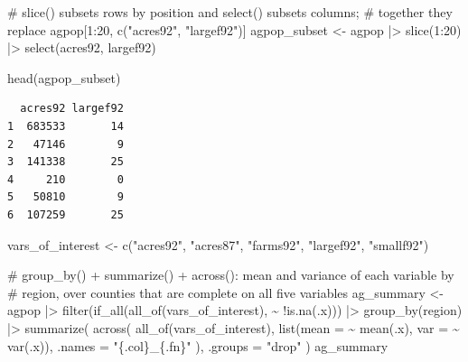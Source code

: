 \documentclass[
  letterpaper,
  DIV=11,
  numbers=noendperiod]{scrreprt}
\newenvironment{Shaded}{\begin{snugshade}}{\end{snugshade}}
\newcommand{\AttributeTok}[1]{\textcolor[rgb]{0.40,0.45,0.13}{#1}}
\newcommand{\CommentTok}[1]{\textcolor[rgb]{0.37,0.37,0.37}{#1}}
\newcommand{\DecValTok}[1]{\textcolor[rgb]{0.68,0.00,0.00}{#1}}
\newcommand{\FunctionTok}[1]{\textcolor[rgb]{0.28,0.35,0.67}{#1}}
\newcommand{\NormalTok}[1]{\textcolor[rgb]{0.00,0.23,0.31}{#1}}
\newcommand{\OtherTok}[1]{\textcolor[rgb]{0.00,0.23,0.31}{#1}}
\newcommand{\SpecialCharTok}[1]{\textcolor[rgb]{0.37,0.37,0.37}{#1}}
\newcommand{\StringTok}[1]{\textcolor[rgb]{0.13,0.47,0.30}{#1}}
\renewcommand{\[}{\begin{equation}}
\renewcommand{\]}{\end{equation}}
\begin{document}
\begin{Shaded}
\begin{Highlighting}[]
\CommentTok{\# slice() subsets rows by position and select() subsets columns;}
\CommentTok{\# together they replace agpop[1:20, c("acres92", "largef92")]}
\NormalTok{agpop\_subset }\OtherTok{\textless{}{-}}\NormalTok{ agpop }\SpecialCharTok{|\textgreater{}}
  \FunctionTok{slice}\NormalTok{(}\DecValTok{1}\SpecialCharTok{:}\DecValTok{20}\NormalTok{) }\SpecialCharTok{|\textgreater{}}
  \FunctionTok{select}\NormalTok{(acres92, largef92)}

\FunctionTok{head}\NormalTok{(agpop\_subset)}
\end{Highlighting}
\end{Shaded}

\begin{verbatim}
  acres92 largef92
1  683533       14
2   47146        9
3  141338       25
4     210        0
5   50810        9
6  107259       25
\end{verbatim}

\begin{Shaded}
\begin{Highlighting}[]
\NormalTok{vars\_of\_interest }\OtherTok{\textless{}{-}} \FunctionTok{c}\NormalTok{(}\StringTok{"acres92"}\NormalTok{, }\StringTok{"acres87"}\NormalTok{, }\StringTok{"farms92"}\NormalTok{, }\StringTok{"largef92"}\NormalTok{, }\StringTok{"smallf92"}\NormalTok{)}

\CommentTok{\# group\_by() + summarize() + across(): mean and variance of each variable by}
\CommentTok{\# region, over counties that are complete on all five variables}
\NormalTok{ag\_summary }\OtherTok{\textless{}{-}}\NormalTok{ agpop }\SpecialCharTok{|\textgreater{}}
  \FunctionTok{filter}\NormalTok{(}\FunctionTok{if\_all}\NormalTok{(}\FunctionTok{all\_of}\NormalTok{(vars\_of\_interest), }\SpecialCharTok{\textasciitilde{}} \SpecialCharTok{!}\FunctionTok{is.na}\NormalTok{(.x))) }\SpecialCharTok{|\textgreater{}}
  \FunctionTok{group\_by}\NormalTok{(region) }\SpecialCharTok{|\textgreater{}}
  \FunctionTok{summarize}\NormalTok{(}
    \FunctionTok{across}\NormalTok{(}
      \FunctionTok{all\_of}\NormalTok{(vars\_of\_interest),}
      \FunctionTok{list}\NormalTok{(}\AttributeTok{mean =} \SpecialCharTok{\textasciitilde{}} \FunctionTok{mean}\NormalTok{(.x), }\AttributeTok{var =} \SpecialCharTok{\textasciitilde{}} \FunctionTok{var}\NormalTok{(.x)),}
      \AttributeTok{.names =} \StringTok{"\{.col\}\_\{.fn\}"}
\NormalTok{    ),}
    \AttributeTok{.groups =} \StringTok{"drop"}
\NormalTok{  )}
\NormalTok{ag\_summary}
\end{Highlighting}
\end{Shaded}
\end{document}
